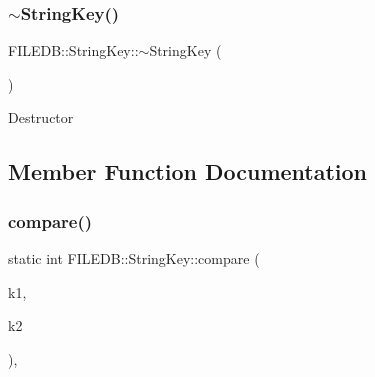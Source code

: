 \subsubsection{\texorpdfstring{$\sim$StringKey()}{~StringKey()}\hspace{0.1cm}{\footnotesize\ttfamily [3/3]}}
{\footnotesize\ttfamily F\+I\+L\+E\+D\+B\+::\+String\+Key\+::$\sim$\+String\+Key (\begin{DoxyParamCaption}\item[{void}]{ }\end{DoxyParamCaption})}

Destructor 

\subsection{Member Function Documentation}
\mbox{\label{classFILEDB_1_1StringKey_a22a3b33f93050dffa239cfc106044935}} 
\subsubsection{\texorpdfstring{compare()}{compare()}\hspace{0.1cm}{\footnotesize\ttfamily [1/3]}}
{\footnotesize\ttfamily static int F\+I\+L\+E\+D\+B\+::\+String\+Key\+::compare (\begin{DoxyParamCaption}\item[{const \mbox{\hyperlink{adat-devel_2other__libs_2filedb_2filehash_2ffdb__db_8h_aa2e0984399491df0fdd20898ca8758f9}{F\+F\+D\+B\+\_\+\+D\+BT}} $\ast$}]{k1,  }\item[{const \mbox{\hyperlink{adat-devel_2other__libs_2filedb_2filehash_2ffdb__db_8h_aa2e0984399491df0fdd20898ca8758f9}{F\+F\+D\+B\+\_\+\+D\+BT}} $\ast$}]{k2 }\end{DoxyParamCaption})\hspace{0.3cm}{\ttfamily [inline]}, {\ttfamily [static]}}

\mbox{\label{classFILEDB_1_1StringKey_a22a3b33f93050dffa239cfc106044935}} 
